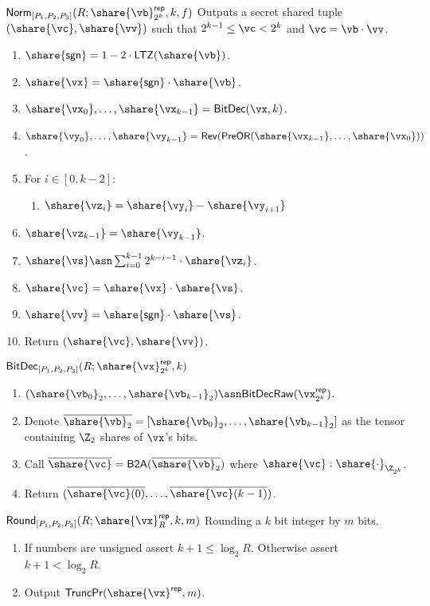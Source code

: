 \msubsubsection
  {$\mathsf{Norm}_{[P_1, P_2, P_3]}(R; \share{\vb}^\mathsf{rep}_{2^k}, k, f)$}
  Outputs a secret shared tuple $(\share{\vc}, \share{\vv})$ such that $2^{k-1} \leq \vc < 2^k$ and $\vc = \vb \cdot \vv$.
  \begin{enumerate}
    \item $\share{\mathsf{sgn}} = 1 - 2 \cdot \mathsf{LTZ}(\share{\vb})$.
    \item $\share{\vx} = \share{\mathsf{sgn}} \cdot \share{\vb}$.
    \item $\share{\vx_0}, \dots, \share{\vx_{k-1}} = \mathsf{BitDec}(\vx, k)$.
    \item $\share{\vy_0}, \dots, \share{\vy_{k-1}} = \mathsf{Rev}(\mathsf{PreOR}(\share{\vx_{k-1}}, \dots, \share{\vx_0}))$.
    \item For $i \in [0, k-2]$:
    \begin{enumerate}
        \item $\share{\vz_i} = \share{\vy_i} - \share{\vy_{i+1}}$
    \end{enumerate}
    \item $\share{\vz_{k-1}} = \share{\vy_{k-1}}$.
    \item $\share{\vs} \asn \sum_{i=0}^{k-1}2^{k-i-1} \cdot \share{\vz_i}$.
    \item $\share{\vc} = \share{\vx} \cdot \share{\vs}$.
    \item $\share{\vv} = \share{\mathsf{sgn}} \cdot \share{\vs}$.
    \item Return $(\share{\vc}, \share{\vv})$.
\end{enumerate}



\msubsubsection
  {$\mathsf{BitDec}_{[P_1, P_2, P_3]}(R; \share{\vx}^\mathsf{rep}_{2^k}, k)$}
  \begin{enumerate}
  \item $(\share{\vb_0}_2, \dots, \share{\vb_{k-1}}_2) \asn \mathsf{BitDecRaw}(\vx^\mathsf{rep}_{2^k})$.
  \item Denote $\overline{\share{\vb}_2} = [\share{\vb_0}_2, \dots, \share{\vb_{k-1}}_2]$ as the tensor containing $\Z_2$ shares of $\vx$'s bits.
  \item Call $\overline{\share{\vc}} = \mathsf{B2A}(\overline{\share{\vb}_2})$ where $\share{\vc}: \share{\cdot}_{\Z_{2^k}}$.
  \item Return $(\overline{\share{\vc}(0)}, \dots, \overline{\share{\vc}(k-1)})$.
\end{enumerate}


\msubsubsection
  {$\mathsf{Round}_{[P_1, P_2, P_3]}(R; \share{\vx}^\mathsf{rep}_R, k, m)$}
  Rounding a $k$ bit integer by $m$ bits.
  \begin{enumerate}
  \item If numbers are unsigned assert $k + 1 \leq \log_2{R}$. Otherwise assert $k+1 < \log_2{R}$.
  \item Output $\mathsf{TruncPr}(\share{\vx}^\mathsf{rep}, m)$.
\end{enumerate}


